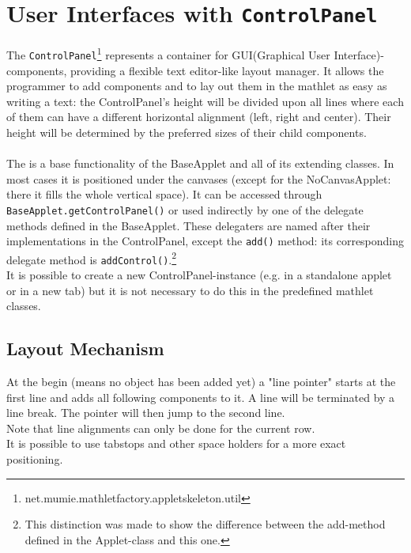 \section{User Interfaces with {\tt ControlPanel}}
  The \verb|ControlPanel|\footnote{net.mumie.mathletfactory.appletskeleton.util} 
  represents a container for GUI(Graphical User Interface)-components,
  providing a flexible text editor-like layout manager. It allows the programmer 
  to add components and to lay out them in the mathlet as easy as writing a text: the
  ControlPanel's height will be divided upon all lines where each of them can have
  a different horizontal alignment (left, right and center). Their height will be determined
  by the preferred sizes of their child components.\\\\
  The \cp is a base functionality of the BaseApplet and all of its
  extending classes. In most cases it is positioned under the canvases (except for
  the NoCanvasApplet: there it fills the whole vertical space). It can be accessed
  through \verb|BaseApplet.getControlPanel()| or used indirectly by one of the delegate
  methods defined in the BaseApplet. These delegaters are named after their
  implementations in the ControlPanel, except the \verb|add()| method: its corresponding
  delegate method is \verb|addControl()|.\footnote{This distinction was made
  to show the difference between the add-method defined in the Applet-class
  and this one.}\\
  It is possible to create a new ControlPanel-instance (e.g. in a standalone applet
  or in a new tab) but it is not necessary to do this in the predefined mathlet
  classes.
  
\subsection{Layout Mechanism}
  At the begin (means no object has been added yet) a "line pointer" starts at the first
  line and adds all following components to it. A line will be terminated by a line
  break. The pointer will then jump to the second line.\\
  Note that line alignments can only be done for the current row.\\
  It is possible to use tabstops and other space holders for a more exact positioning.
  
